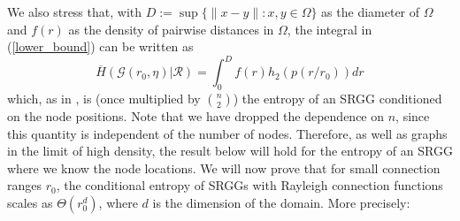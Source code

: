\documentclass{article}
\newcommand{\graph}{\mathcal{G}}
\begin{document}
    We also stress that, with $D := \sup\{\|x-y\| : x,y \in \Omega\}$ as the diameter of $\Omega$ and $f(r)$ as the density of pairwise distances in $\Omega$, the integral in (\ref{lower_bound}) can be written as 
    \begin{equation}
        \label{eq:entropy_per_edge}
        \overline{H}(\graph(r_0,\eta)|\mathcal{R}) = \int_0^D f(r)h_2(p(r/r_0)) dr
    \end{equation}
    which, as in \cite{coon2018entropy}, is (once multiplied by $\binom{n}{2}$) the entropy of an SRGG conditioned on the node positions. Note that we have dropped the dependence on $n$, since this quantity is independent of the number of nodes. Therefore, as well as graphs in the limit of high density, the result below will hold for the entropy of an SRGG where we know the node locations. We will now prove that for small connection ranges $r_0$, the conditional entropy of SRGGs with Rayleigh connection functions scales as $\Theta(r_0^d)$, where $d$ is the dimension of the domain. More precisely:
\end{document}
